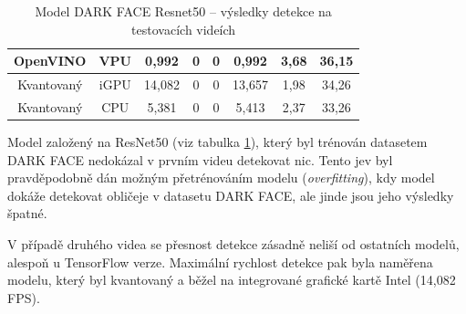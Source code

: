 \begin{table}[H]
\begin{tabular}{cc|ccc|ccc|}
  \multicolumn{1}{|c|}{\cellcolor[HTML]{E0DBDB}OpenVINO}       & \cellcolor[HTML]{E0DBDB}VPU  & \multicolumn{1}{c|}{0,992}                                  & \multicolumn{1}{c|}{0}                                      & 0              & \multicolumn{1}{c|}{0,992}                                  & \multicolumn{1}{c|}{3,68}                                   & 36,15          \\ \hline
  \multicolumn{1}{|c|}{\cellcolor[HTML]{E0DBDB}Kvantovaný}     & \cellcolor[HTML]{E0DBDB}iGPU & \multicolumn{1}{c|}{14,082}                                 & \multicolumn{1}{c|}{0}                                      & 0              & \multicolumn{1}{c|}{13,657}                                 & \multicolumn{1}{c|}{1,98}                                   & 34,26          \\ \hline
  \multicolumn{1}{|c|}{\cellcolor[HTML]{E0DBDB}Kvantovaný}     & \cellcolor[HTML]{E0DBDB}CPU  & \multicolumn{1}{c|}{5,381}                                  & \multicolumn{1}{c|}{0}                                      & 0              & \multicolumn{1}{c|}{5,413}                                  & \multicolumn{1}{c|}{2,37}                                   & 33,26          \\ \hline
  \end{tabular}
  \label{tabulka:dfrvidea}
  \caption{Model DARK FACE Resnet50 -- výsledky detekce na testovacích videích}
\end{table}

Model založený na ResNet50 (viz tabulka \ref{tabulka:dfrvidea}), který byl trénován datasetem DARK FACE nedokázal v prvním videu detekovat nic. Tento jev byl pravděpodobně dán možným přetrénováním modelu (\emph{overfitting}), kdy model dokáže detekovat obličeje v datasetu DARK FACE, ale jinde jsou jeho výsledky špatné. 

V případě druhého videa se přesnost detekce zásadně neliší od ostatních modelů, alespoň u TensorFlow verze. Maximální rychlost detekce pak byla naměřena modelu, který byl kvantovaný a běžel na integrované grafické kartě Intel (14,082 FPS).


